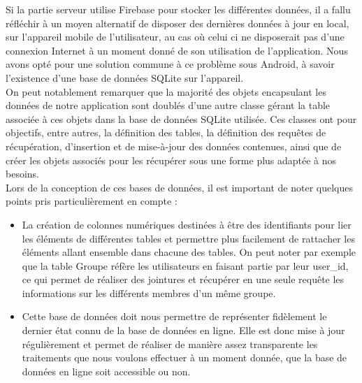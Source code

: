 Si la partie serveur utilise Firebase pour stocker les différentes données, il a fallu réfléchir à un moyen alternatif de disposer des dernières données à jour en local, sur l'appareil mobile de l'utilisateur, au cas où celui ci ne disposerait pas d'une connexion Internet à un moment donné de son utilisation de l'application. Nous avons opté pour une solution commune à ce problème sous Android, à savoir l'existence d'une base de données SQLite sur l'appareil. \\
On peut notablement remarquer que la majorité des objets encapsulant les données de notre application sont doublés d'une autre classe gérant la table associée à ces objets dans la base de données SQLite utilisée. Ces classes ont pour objectifs, entre autres, la définition des tables, la définition des requêtes de récupération, d'insertion et de mise-à-jour des données contenues, ainsi que de créer les objets associés pour les récupérer sous une forme plus adaptée à nos besoins.\\
Lors de la conception de ces bases de données, il est important de noter quelques points pris particulièrement en compte :
\begin{itemize}
\item La création de colonnes numériques destinées à être des identifiants pour lier les éléments de différentes tables et permettre plus facilement de rattacher les éléments allant ensemble dans chacune des tables. On peut noter par exemple que la table Groupe réfère les utilisateurs en faisant partie par leur user_id, ce qui permet de réaliser des jointures et récupérer en une seule requête les informations sur les différents membres d'un même groupe.
\item Cette base de données doit nous permettre de représenter fidèlement le dernier état connu de la base de données en ligne. Elle est donc mise à jour régulièrement et permet de réaliser de manière assez transparente les traitements que nous voulons effectuer à un moment donnée, que la base de données en ligne soit accessible ou non.
\end{itemize}